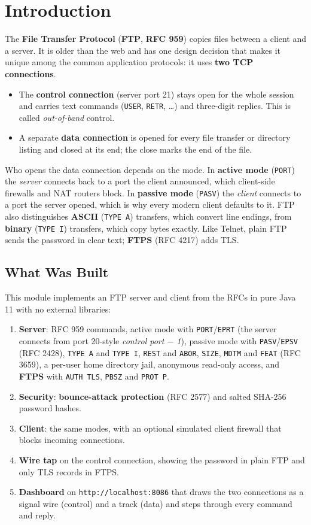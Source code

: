 \documentclass[11pt,a4paper]{article}
\begin{document}
\section{Introduction}
\noindent The \textbf{File Transfer Protocol} (\textbf{FTP}, \textbf{RFC 959}) copies files between a client and a server. It is older than the web and has one design decision that makes it unique among the common application protocols: it uses \textbf{two TCP connections}.
\begin{itemize}[leftmargin=2em]
    \item The \textbf{control connection} (server port 21) stays open for the whole session and carries text commands (\texttt{USER}, \texttt{RETR}, \ldots) and three-digit replies. This is called \emph{out-of-band} control.
    \item A separate \textbf{data connection} is opened for every file transfer or directory listing and closed at its end; the close marks the end of the file.
\end{itemize}
Who opens the data connection depends on the mode. In \textbf{active mode} (\texttt{PORT}) the \emph{server} connects back to a port the client announced, which client-side firewalls and NAT routers block. In \textbf{passive mode} (\texttt{PASV}) the \emph{client} connects to a port the server opened, which is why every modern client defaults to it. FTP also distinguishes \textbf{ASCII} (\texttt{TYPE A}) transfers, which convert line endings, from \textbf{binary} (\texttt{TYPE I}) transfers, which copy bytes exactly. Like Telnet, plain FTP sends the password in clear text; \textbf{FTPS} (RFC 4217) adds TLS.

\subsection{What Was Built}
This module implements an FTP server and client from the RFCs in pure Java 11 with no external libraries:
\begin{enumerate}[leftmargin=2em]
    \item \textbf{Server}: RFC 959 commands, active mode with \texttt{PORT}/\texttt{EPRT} (the server connects from port 20-style \emph{control port $-$ 1}), passive mode with \texttt{PASV}/\texttt{EPSV} (RFC 2428), \texttt{TYPE A} and \texttt{TYPE I}, \texttt{REST} and \texttt{ABOR}, \texttt{SIZE}, \texttt{MDTM} and \texttt{FEAT} (RFC 3659), a per-user home directory jail, anonymous read-only access, and \textbf{FTPS} with \texttt{AUTH TLS}, \texttt{PBSZ} and \texttt{PROT P}.
    \item \textbf{Security}: \textbf{bounce-attack protection} (RFC 2577) and salted SHA-256 password hashes.
    \item \textbf{Client}: the same modes, with an optional simulated client firewall that blocks incoming connections.
    \item \textbf{Wire tap} on the control connection, showing the password in plain FTP and only TLS records in FTPS.
    \item \textbf{Dashboard} on \texttt{http://localhost:8086} that draws the two connections as a signal wire (control) and a track (data) and steps through every command and reply.
\end{enumerate}
\end{document}
